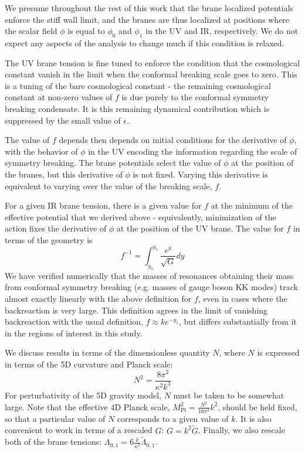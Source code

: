 \documentclass[12pt]{article}
\renewcommand{\tilde}{\widetilde} %
\begin{document}
We presume throughout the rest of this work that the brane localized potentials enforce the stiff wall limit, and the branes are thus localized at positions where the scalar field $\phi$ is equal to $\phi_0$ and $\phi_1$ in the UV and IR, respectively.  We do not expect any aspects of the analysis to change much if this condition is relaxed.  

The UV brane tension is fine tuned to enforce the condition that the cosmological constant vanish in the limit when the conformal breaking scale goes to zero.  This is a tuning of the bare cosmological constant - the remaining cosmological constant at non-zero values of $f$ is due purely to the conformal symmetry breaking condensate.  It is this remaining dynamical contribution which is suppressed by the small value of $\epsilon$.  

The value of $f$ depends then depends on initial conditions for the derivative of $\phi$, with the behavior of $\phi$ in the UV encoding the information regarding the scale of symmetry breaking.  The brane potentials select the value of $\phi$ at the position of the branes, but this derivative of $\phi$ is not fixed.  Varying this derivative is equivalent to varying over the value of the breaking scale, $f$.  

For a given IR brane tension, there is a given value for $f$ at the minimum of the effective potential that we derived above - equivalently, minimization of the action fixes the derivative of $\phi$ at the position of the UV brane. The value for $f$ in terms of the geometry is
\begin{equation}
f^{-1} = \int_{y_0}^{y_1} \frac{e^{y}}{\sqrt{G}} dy
\label{eq:feq}
\end{equation}
We have verified numerically that the masses of resonances obtaining their mass from conformal symmetry breaking (e.g. masses of gauge boson KK modes) track almost exactly linearly with the above definition for $f$, even in cases where the backreaction is very large.  This definition agrees in the limit of vanishing backreaction with the usual definition, $f \approx k e^{-y_1}$, but differs substantially from it in the regions of interest in this study.  

We discuss results in terms of the dimensionless quantity $N$, where $N$ is expressed in terms of the 5D curvature and Planck scale:
\begin{equation}
N^2 = \frac{8 \pi^2}{\kappa^2 k^3}
\end{equation}
For perturbativity of the 5D gravity model, $N$ must be taken to be somewhat large.  Note that the effective 4D Planck scale, $M_\text{Pl}^2 = \frac{N^2}{16 \pi^2} k^2$, should be held fixed, so that a particular value of $N$ corresponds to a given value of $k$.  It is also convenient to work in terms of a rescaled $G$:  $G = k^2 \tilde{G}$.  Finally, we also rescale both of the brane tensions: $\Lambda_{0,1} = 6 \frac{k}{\kappa^2} \tilde{\Lambda}_{0,1}$.  
\end{document}

